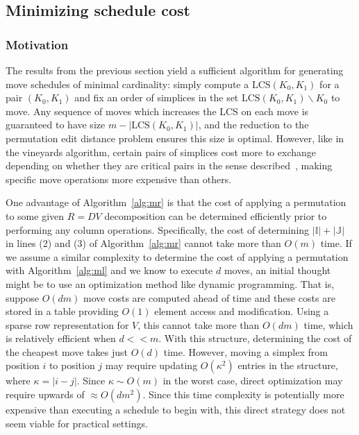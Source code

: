 \documentclass{siamart190516}
\begin{document}
\subsection{Minimizing schedule cost}\label{sec:schedule_cost}
\subsubsection{Motivation}
The results from the previous section yield a sufficient algorithm for generating move schedules of minimal cardinality: simply compute a $\mathrm{LCS}(K_0, K_1)$ for a pair $(K_0, K_1)$ and fix an order of simplices in the set $\mathrm{LCS}(K_0, K_1) \smallsetminus K_0$ to move. Any sequence of moves which increases the LCS on each move is guaranteed to have size $m - \lvert \mathrm{LCS}(K_0, K_1) \rvert$, and the reduction to the permutation edit distance problem ensures this size is optimal. 
However, like in the vineyards algorithm, certain pairs of simplices cost more to exchange depending on whether they are critical pairs in the sense described~\cite{cohen2006vines}, making specific move operations more expensive than others. 

One advantage of Algorithm~\ref{alg:mr} is that the cost of applying a permutation to some given $R = D V$ decomposition can be determined efficiently prior to performing any column operations. 
Specifically, the cost of determining $\lvert \mathbb{I}\rvert + \lvert \mathbb{J}\rvert$ in lines (2) and (3) of Algorithm~\ref{alg:mr} cannot take more than $O(m)$ time. If we assume a similar complexity to determine the cost of applying a permutation with Algorithm~\ref{alg:ml} and we know to execute $d$ moves, an initial thought might be to use an optimization method like dynamic programming. 
That is, suppose $O(dm)$ move costs are computed ahead of time and these costs are stored in a table providing $O(1)$ element access and modification. Using a sparse row representation for $V$, this cannot take more than $O(dm)$ time, which is relatively efficient when $d << m$. With this structure, determining the cost of the cheapest move takes just $O(d)$ time. However, moving a simplex from position $i$ to position $j$ may require updating $O(\kappa^2)$ entries in the structure, where $\kappa = \lvert i - j \rvert$. Since $\kappa \sim O(m)$ in the worst case, direct optimization may require upwards of $\approx O(dm^2)$. Since this time complexity is potentially more expensive than executing a schedule to begin with, this direct strategy does not seem viable for practical settings. 
\end{document}
